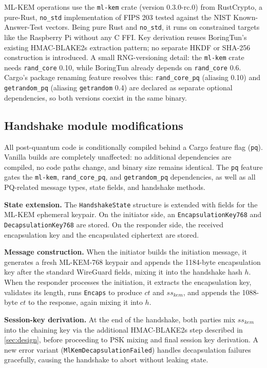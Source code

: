 \documentclass[11pt,a4paper]{article}
\begin{document}
ML-KEM operations use the \texttt{ml-kem} crate (version 0.3.0-rc.0) from RustCrypto, a pure-Rust, \texttt{no\_std} implementation of FIPS 203 tested against the NIST Known-Answer-Test vectors. Being pure Rust and \texttt{no\_std}, it runs on constrained targets like the Raspberry Pi without any C FFI. Key derivation reuses BoringTun's existing HMAC-BLAKE2s extraction pattern; no separate HKDF or SHA-256 construction is introduced. A small RNG-versioning detail: the \texttt{ml-kem} crate needs \texttt{rand\_core} 0.10, while BoringTun already depends on \texttt{rand\_core} 0.6. Cargo's package renaming feature resolves this: \texttt{rand\_core\_pq} (aliasing 0.10) and \texttt{getrandom\_pq} (aliasing \texttt{getrandom} 0.4) are declared as separate optional dependencies, so both versions coexist in the same binary.

\subsection{Handshake module modifications}

All post-quantum code is conditionally compiled behind a Cargo feature flag (\texttt{pq}). Vanilla builds are completely unaffected: no additional dependencies are compiled, no code paths change, and binary size remains identical. The \texttt{pq} feature gates the \texttt{ml-kem}, \texttt{rand\_core\_pq}, and \texttt{getrandom\_pq} dependencies, as well as all PQ-related message types, state fields, and handshake methods.

\textbf{State extension.} The \texttt{HandshakeState} structure is extended with fields for the ML-KEM ephemeral keypair. On the initiator side, an \texttt{EncapsulationKey768} and \texttt{DecapsulationKey768} are stored. On the responder side, the received encapsulation key and the encapsulated ciphertext are stored.

\textbf{Message construction.} When the initiator builds the initiation message, it generates a fresh ML-KEM-768 keypair and appends the 1184-byte encapsulation key after the standard WireGuard fields, mixing it into the handshake hash $h$. When the responder processes the initiation, it extracts the encapsulation key, validates its length, runs \texttt{Encaps} to produce $\mathit{ct}$ and $\mathit{ss}_\mathit{kem}$, and appends the 1088-byte $\mathit{ct}$ to the response, again mixing it into $h$.

\textbf{Session-key derivation.} At the end of the handshake, both parties mix $\mathit{ss}_\mathit{kem}$ into the chaining key via the additional HMAC-BLAKE2s step described in \cref{sec:design}, before proceeding to PSK mixing and final session key derivation. A new error variant (\texttt{MlKemDecapsulationFailed}) handles decapsulation failures gracefully, causing the handshake to abort without leaking state.
\end{document}
